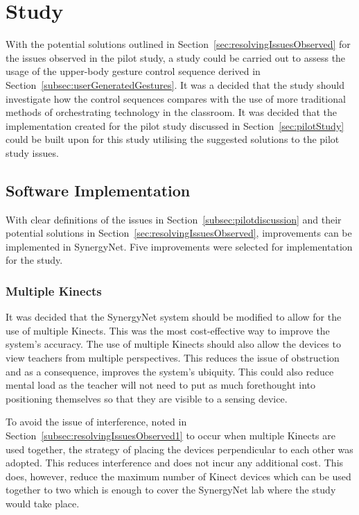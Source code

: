 \documentclass[link]{IWCOMP}
\begin{document}
\section{Study}
\label{sec:study}

With the potential solutions outlined in Section~\ref{sec:resolvingIssuesObserved} for the issues observed in the pilot study, a study could be carried out to assess the usage of the upper-body gesture control sequence derived in Section~\ref{subsec:userGeneratedGestures}.
It was a decided that the study should investigate how the control sequences compares with the use of more traditional methods of orchestrating technology in the classroom.
It was decided that the implementation created for the pilot study discussed in Section~\ref{sec:pilotStudy} could be built upon for this study utilising the suggested solutions to the pilot study issues.

\subsection{Software Implementation}
\label{subsec:studyImplementation}

With clear definitions of the issues in Section~\ref{subsec:pilotdiscussion} and their potential solutions in Section~\ref{sec:resolvingIssuesObserved}, improvements can be implemented in SynergyNet.
Five improvements were selected for implementation for the study.

\subsubsection{Multiple Kinects} 
\label{subsubsec:studyImplementationMultipleKinects}

It was decided that the SynergyNet system should be modified to allow for the use of multiple Kinects.
This was the most cost-effective way to improve the system's accuracy.
The use of multiple Kinects should also allow the devices to view teachers from multiple perspectives.
This reduces the issue of obstruction and as a consequence, improves the system's ubiquity.
This could also reduce mental load as the teacher will not need to put as much forethought into positioning themselves so that they are visible to a sensing device.

To avoid the issue of interference, noted in Section~\ref{subsec:resolvingIssuesObserved1} to occur when multiple Kinects are used together, the strategy of placing the devices perpendicular to each other was adopted.
This reduces interference and does not incur any additional cost.
This does, however, reduce the maximum number of Kinect devices which can be used together to two which is enough to cover the SynergyNet lab where the study would take place.
\end{document}
